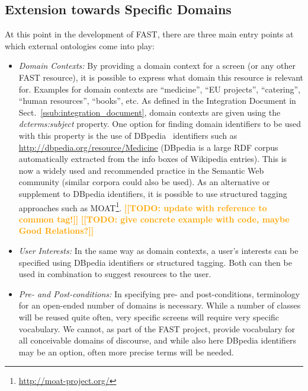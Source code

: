 \documentclass[twoside]{fast_latex}
\newcommand{\todo}[1]{\textsf{\textbf{\textcolor{Orange}{[[TODO: #1]]}}}}
\newcommand{\todo}[1]{}
\begin{document}
\subsection{Extension towards Specific Domains} %
\label{sub:extension_towards_specific_domains}

At this point in the development of FAST, there are three main entry points at which external ontologies come into play:

\begin{itemize}
	\item \emph{Domain Contexts:} By providing a domain context for a screen (or any other FAST resource), it is possible to express what domain this resource is relevant for. Examples for domain contexts are ``medicine'', ``EU projects'', ``catering'', ``human resources'', ``books'', etc. As defined in the Integration Document in Sect.~\ref{ssub:integration_document}, domain contexts are given using the \emph{dcterms:subject} property. One option for finding domain identifiers to be used with this property is the use of DBpedia~\cite{Auer07dbpedia} identifiers such as \url{http://dbpedia.org/resource/Medicine} (DBpedia is a large RDF corpus automatically extracted from the info boxes of Wikipedia entries). This is now a widely used and recommended practice in the Semantic Web community (similar corpora could also be used). As an alternative or supplement to DBpedia identifiers, it is possible to use structured tagging approaches such as MOAT\footnote{\url{http://moat-project.org/}}.
	\todo{update with reference to common tag!}
	\todo{give concrete example with code, maybe Good Relations?}
	\item \emph{User Interests:} In the same way as domain contexts, a user's interests can be specified using DBpedia identifiers or structured tagging. Both can then be used in combination to suggest resources to the user.
	\item \emph{Pre- and Post-conditions:} In specifying pre- and post-conditions, terminology for an open-ended number of domains is necessary. While a number of classes will be reused quite often, very specific screens will require very specific vocabulary. We cannot, as part of the FAST project, provide vocabulary for all conceivable domains of discourse, and while also here DBpedia identifiers may be an option, often more precise terms will be needed.
\end{itemize}
\end{document}
